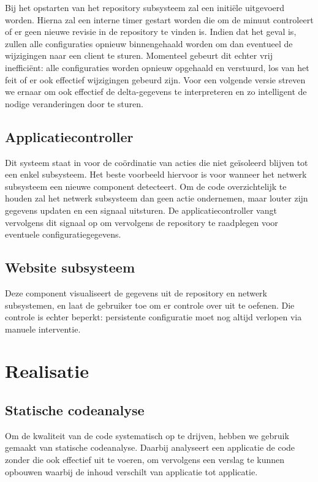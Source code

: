 Bij het opstarten van het repository subsysteem zal een initiële  uitgevoerd worden. Hierna zal een interne timer gestart worden die om de minuut controleert of er geen nieuwe revisie in de repository te vinden is. Indien dat het geval is, zullen alle configuraties opnieuw binnengehaald worden om dan eventueel de wijzigingen naar een client te sturen. Momenteel gebeurt dit echter vrij inefficiënt: alle configuraties worden opnieuw opgehaald en verstuurd, los van het feit of er ook effectief wijzigingen gebeurd zijn. Voor een volgende versie streven we ernaar om ook effectief de delta-gegevens te interpreteren en zo intelligent de nodige veranderingen door te sturen.

\section{Applicatiecontroller}

Dit systeem staat in voor de coördinatie van acties die niet geïsoleerd blijven tot een enkel subsysteem. Het beste voorbeeld hiervoor is voor wanneer het netwerk subsysteem een nieuwe component detecteert. Om de code overzichtelijk te houden zal het netwerk subsysteem dan geen actie ondernemen, maar louter zijn gegevens updaten en een signaal uitsturen. De applicatiecontroller vangt vervolgens dit signaal op om vervolgens de repository te raadplegen voor eventuele configuratiegegevens.

\section{Website subsysteem}

Deze component visualiseert de gegevens uit de repository en netwerk subsystemen, en laat de gebruiker toe om er controle over uit te oefenen. Die controle is echter beperkt: persistente configuratie moet nog altijd verlopen via manuele interventie.

\chapter{Realisatie}

\section{Statische codeanalyse}
\label{server:realisatie:codeanalyse}

Om de kwaliteit van de code systematisch op te drijven, hebben we gebruik gemaakt van statische codeanalyse. Daarbij analyseert een applicatie de code zonder die ook effectief uit te voeren, om vervolgens een verslag te kunnen opbouwen waarbij de inhoud verschilt van applicatie tot applicatie.

